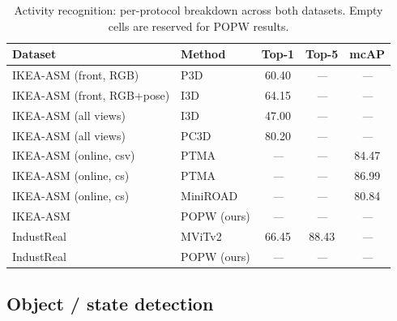 \documentclass[11pt,a4paper]{article}
\newcommand{\popw}{POPW}
\newcommand{\ikea}{IKEA-ASM}
\newcommand{\industreal}{IndustReal}
\newcommand{\todo}{\textit{---}}              %
\newcommand{\popwres}{\todo}                  %
\begin{document}
\begin{table}[!htbp]
\centering
\small
\caption{Activity recognition: per-protocol breakdown across both datasets.
Empty cells are reserved for \popw{} results.}
\label{tab:activity-breakdown}
\renewcommand{\arraystretch}{1.15}
\begin{tabular}{l l c c c}
\toprule
\textbf{Dataset} & \textbf{Method} & \textbf{Top-1} & \textbf{Top-5} & \textbf{mcAP} \\
\midrule
\ikea{} (front, RGB)    & P3D~\cite{benshabat2021ikea}                 & 60.40 & \todo & \todo \\
\ikea{} (front, RGB+pose) & I3D~\cite{benshabat2021ikea}               & 64.15 & \todo & \todo \\
\ikea{} (all views)     & I3D~\cite{benshabat2021ikea}                 & 47.00 & \todo & \todo \\
\ikea{} (all views)     & PC3D~\cite{aganian2023ikea}                  & 80.20 & \todo & \todo \\
\ikea{} (online, csv)   & PTMA~\cite{xie2025ptma}                      & \todo & \todo & 84.47 \\
\ikea{} (online, cs)    & PTMA~\cite{xie2025ptma}                      & \todo & \todo & 86.99 \\
\ikea{} (online, cs)    & MiniROAD~\cite{xie2025ptma}                  & \todo & \todo & 80.84 \\
\ikea{}                 & \popw{} (ours)                               & \popwres & \popwres & \popwres \\
\midrule
\industreal{}           & MViTv2~\cite{schoonbeek2024industreal}       & 66.45 & 88.43 & \todo \\
\industreal{}           & \popw{} (ours)                               & \popwres & \popwres & \popwres \\
\bottomrule
\end{tabular}
\end{table}

\subsection{Object / state detection}
\label{sec:detection-breakdown}
\end{document}
